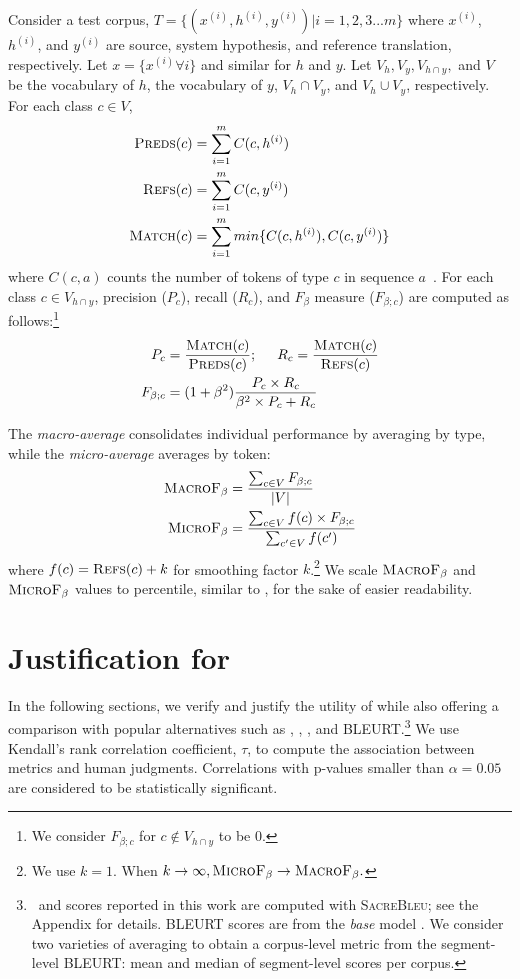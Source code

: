 Consider a test corpus, $T = \{ (x^{(i)}, h^{(i)}, y^{(i)}) | i = 1,2,3...m \}$ where $x^{(i)}$, $h^{(i)}$, and $y^{(i)}$ are source, system hypothesis, and reference translation, respectively. Let $x = \{x^{(i)} \forall i\}$ and similar for $h$ and $y$.  Let $V_h, V_y, V_{h\cap y},$ and $V$ be the vocabulary of $h$, the vocabulary of $y$, $V_h \cap V_y$, and $V_h \cup V_y$, respectively.
For each class $c \in V$, 
\begin{align*}
 \textsc{Preds}(c) &= \sum_{i=1}^m C(c, h^{(i)})\\
 \textsc{Refs}(c) &= \sum_{i=1}^m C(c, y^{(i)})\\
\textsc{Match}(c) &= \sum_{i=1}^m min\{C(c, h^{(i)}), C(c, y^{(i)})\} 
\end{align*}
\noindent where $C(c, a)$  counts the number of tokens of type $c$ in sequence $a$~\cite{papineni-etal-2002-bleu}. 
For each class $c \in V_{h \cap y}$, precision ($P_c$), recall ($R_c$), and $F_\beta$ measure ($F_{\beta;c}$) are computed as follows:\footnote{We consider $F_{\beta;c}$ for $c \not\in V_{h \cap y}$ to be 0.}
\begin{align*}
    P_c &= \frac{\textsc{Match}(c)}{\textsc{Preds}(c)} ; \hspace{5mm} R_c = \frac{\textsc{Match}(c)}{\textsc{Refs}(c)} \\
    F_{\beta;c} &= (1 + \beta^2)  \frac{ P_c \times R_c}{ \beta^2 \times P_c + R_c}
\end{align*}

The \textit{macro-average} consolidates individual performance by averaging by type, while the \textit{micro-average} averages by token:  
\begin{align*}
\textsc{MacroF}{\text{$_{{\beta}}$}} &= \frac{\sum_{c \in V} F_{\beta;c}} {|V|}\\
\textsc{MicroF}{\text{$_{{\beta}}$}} &= \frac{\sum_{c\in V} f(c) \times F_{\beta;c}} {\sum_{c'\in V} f(c')}
\end{align*}
\noindent where $f(c) = \textsc{Refs}(c)+k$ for smoothing factor $k$.\footnote{We use $k=1$. When $k \rightarrow \infty, \space \textsc{MicroF}{\text{$_{{\beta}}$}} \rightarrow \textsc{MacroF}{\text{$_{{\beta}}$}}. $} We scale $\textsc{MacroF}{\text{$_{{\beta}}$}}$ and $\textsc{MicroF}{\text{$_{{\beta}}$}}$ values to percentile, similar to \bleu, for the sake of easier readability. 


\section{Justification for \texorpdfstring{}{MacroF1}}
\label{sec:justific}

In the following sections, we verify and justify the utility of  while also offering a comparison with popular alternatives such as , \bleu, , and BLEURT.\footnote{\bleu\ and  scores reported in this work are computed with \textsc{SacreBleu}; see the Appendix for details.
BLEURT scores are from the \textit{base} model \citep{sellam-etal-2020-bleurt}. We consider two varieties of averaging to obtain a corpus-level metric from the segment-level BLEURT: mean and median of segment-level scores per corpus.
}
We use Kendall's rank correlation coefficient, $\tau$, to compute the association between metrics and human judgments.
Correlations with p-values smaller than $\alpha=0.05$ are considered to be statistically significant.



